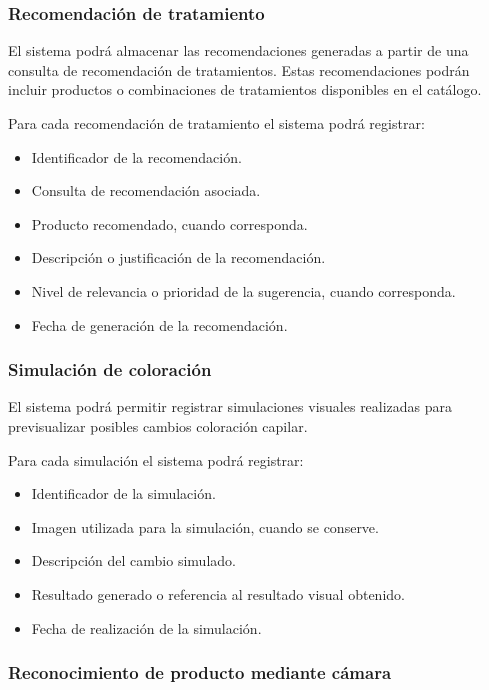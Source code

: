 \subsubsection*{Recomendación de tratamiento}

El sistema podrá almacenar las recomendaciones generadas a partir de una consulta de recomendación de tratamientos. Estas recomendaciones podrán incluir productos o combinaciones de tratamientos disponibles en el catálogo.

Para cada recomendación de tratamiento el sistema podrá registrar:

\begin{itemize}
    \item Identificador de la recomendación.
    \item Consulta de recomendación asociada.
    \item Producto recomendado, cuando corresponda.
    \item Descripción o justificación de la recomendación.
    \item Nivel de relevancia o prioridad de la sugerencia, cuando corresponda.
    \item Fecha de generación de la recomendación.
\end{itemize}

\subsubsection*{Simulación de coloración}

El sistema podrá permitir registrar simulaciones visuales realizadas para previsualizar posibles cambios coloración capilar.

Para cada simulación el sistema podrá registrar:

\begin{itemize}
    \item Identificador de la simulación.
    \item Imagen utilizada para la simulación, cuando se conserve.
    \item Descripción del cambio simulado.
    \item Resultado generado o referencia al resultado visual obtenido.
    \item Fecha de realización de la simulación.
\end{itemize}

\subsubsection*{Reconocimiento de producto mediante cámara}

